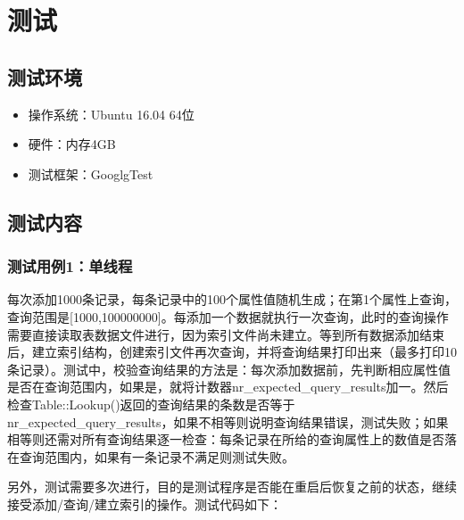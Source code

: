 \documentclass[bachelor]{thesis-uestc}
\begin{document}
\chapter{测试}
\section{测试环境}
\begin{itemize}
	\item 操作系统：Ubuntu 16.04 64位
	\item 硬件：内存4GB
	\item 测试框架：GooglgTest
\end{itemize}

\section{测试内容}
\subsection{测试用例1：单线程}
每次添加1000条记录，每条记录中的100个属性值随机生成；在第1个属性上查询，查询范围是[1000,100000000]。每添加一个数据就执行一次查询，此时的查询操作需要直接读取表数据文件进行，因为索引文件尚未建立。等到所有数据添加结束后，建立索引结构，创建索引文件再次查询，并将查询结果打印出来（最多打印10条记录）。测试中，校验查询结果的方法是：每次添加数据前，先判断相应属性值是否在查询范围内，如果是，就将计数器nr\_expected\_query\_results加一。然后检查Table::Lookup()返回的查询结果的条数是否等于nr\_expected\_query\_results，如果不相等则说明查询结果错误，测试失败；如果相等则还需对所有查询结果逐一检查：每条记录在所给的查询属性上的数值是否落在查询范围内，如果有一条记录不满足则测试失败。\par
另外，测试需要多次进行，目的是测试程序是否能在重启后恢复之前的状态，继续接受添加/查询/建立索引的操作。测试代码如下：
\end{document}
